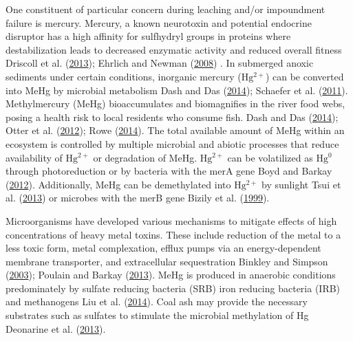 \documentclass[ms]{uncgdissertationexp}
\theoremstyle{plain}
\theoremstyle{definition}
\theoremstyle{remark}
\begin{document}
  One constituent of particular concern during leaching and/or impoundment
  failure is mercury. Mercury, a known neurotoxin and potential endocrine
  disruptor has a high affinity for sulfhydryl groups in proteins where
  destabilization leads to decreased enzymatic activity and reduced
  overall fitness Driscoll et al.
  (\protect\hyperlink{ref-driscollMercuryGlobalPollutant2013}{2013});
  Ehrlich and Newman
  (\protect\hyperlink{ref-ehrlichGeomicrobiologyFifthEdition2008}{2008}) .
  In submerged anoxic sediments under certain conditions, inorganic
  mercury (\(\mathrm{Hg^{2+}}\)) can be converted into MeHg by microbial
  metabolism Dash and Das
  (\protect\hyperlink{ref-dashBioremediationPotentialMercury2014}{2014});
  Schaefer et al.
  (\protect\hyperlink{ref-schaeferActiveTransportSubstrate2011}{2011}).
  Methylmercury (MeHg) bioaccumulates and biomagnifies in the river food
  webs, posing a health risk to local residents who consume fish. Dash and
  Das
  (\protect\hyperlink{ref-dashBioremediationPotentialMercury2014}{2014});
  Otter et al.
  (\protect\hyperlink{ref-otterTrophicStatusMetal2012}{2012}); Rowe
  (\protect\hyperlink{ref-roweBioaccumulationEffectsMetals2014}{2014}).
  The total available amount of MeHg within an ecosystem is controlled by
  multiple microbial and abiotic processes that reduce availability of
  \(\mathrm{Hg^{2+}}\) or degradation of MeHg. \(\mathrm{Hg^{2+}}\) can be
  volatilized as \(\mathrm{Hg^{0}}\) through photoreduction or by bacteria
  with the merA gene Boyd and Barkay
  (\protect\hyperlink{ref-boydMercuryResistanceOperon2012}{2012}).
  Additionally, MeHg can be demethylated into \(\mathrm{Hg^{2+}}\) by
  sunlight Tsui et al.
  (\protect\hyperlink{ref-tsuiPhotodegradationMethylmercuryStream2013}{2013})
  or microbes with the merB gene Bizily et al.
  (\protect\hyperlink{ref-bizilyPhytoremediationMethylmercuryPollution1999}{1999}).
  
  Microorganisms have developed various mechanisms to mitigate effects of
  high concentrations of heavy metal toxins. These include reduction of
  the metal to a less toxic form, metal complexation, efflux pumps via an
  energy-dependent membrane transporter, and extracellular sequestration
  Binkley and Simpson
  (\protect\hyperlink{ref-binkleyHeavyMetalsWastewater2003}{2003});
  Poulain and Barkay
  (\protect\hyperlink{ref-poulainCrackingMercuryMethylation2013}{2013}).
  MeHg is produced in anaerobic conditions predominately by sulfate
  reducing bacteria (SRB) iron reducing bacteria (IRB) and methanogens Liu
  et al.
  (\protect\hyperlink{ref-liuAnalysisMicrobialCommunity2014}{2014}). Coal
  ash may provide the necessary substrates such as sulfates to stimulate
  the microbial methylation of Hg Deonarine et al.
  (\protect\hyperlink{ref-deonarineEnvironmentalImpactsTennessee2013}{2013}).
  
\end{document}

